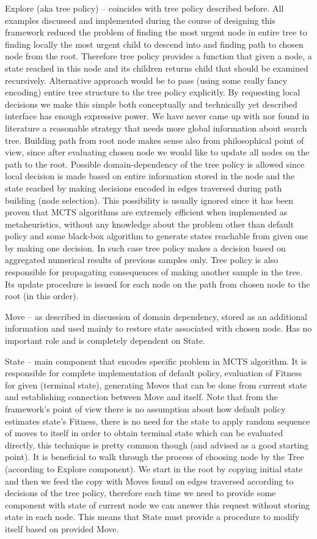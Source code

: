 Explore (aka tree policy) -- coincides with tree policy described before.
All examples discussed and implemented during the course of designing this
framework reduced the problem of finding the most urgent node in entire tree to
finding locally the most urgent child to descend into and finding path to
chosen node from the root. Therefore tree policy provides a function that
given a node, a state reached in this node and its children returns child that
should be examined recursively. Alternative approach would be to pass (using
some really fancy encoding) entire tree structure to the tree policy
explicitly. By requesting local decisions we make this simple both conceptually
and technically yet described interface has enough expressive power. We have
never came up with nor found in literature a reasonable strategy that needs
more global information about search tree.
Building path from root node makes sense also from philosophical point of view,
since after evaluating chosen node we would like to update all nodes on the
path to the root.
Possible domain-dependency of the tree policy is allowed since local decision
is made based on entire information stored in the node and the state reached by
making decisions encoded in edges traversed during path building (node
selection).
This possibility is usually ignored since it has been proven that MCTS
algorithms are extremely efficient when implemented as metaheuristics, without
any knowledge about the problem other than default policy and some black-box
algorithm to generate states reachable from given one by making one decision.
In such case tree policy makes a decision based on aggregated numerical results
of previous samples only. Tree policy is also responsible for propagating
consequences of making another sample in the tree. Its update procedure is
issued for each node on the path from chosen node to the root (in this order).

Move -- as described in discussion of domain dependency, stored as an
additional information and used mainly to restore state associated with chosen
node. Has no important role and is completely dependent on State.

State -- main component that encodes specific problem in MCTS algorithm.
It is responsible for complete implementation of default policy, evaluation of
Fitness for given (terminal state), generating Moves that can be done from
current state and establishing connection between Move and itself.
Note that from the framework's point of view there is no assumption about how
default policy estimates state's Fitness, there is no need for the state to
apply random sequence of moves to itself in order to obtain terminal state
which can be evaluated directly, this technique is pretty common though (and
advised as a good starting point).
It is beneficial to walk through the process of choosing node by the Tree
(according to Explore component). We start in the root by copying initial
state and then we feed the copy with Moves found on edges traversed
according to decisions of the tree policy, therefore each time we need to
provide some component with state of current node we can answer this request
without storing state in each node. This means that State must provide a
procedure to modify itself based on provided Move.

